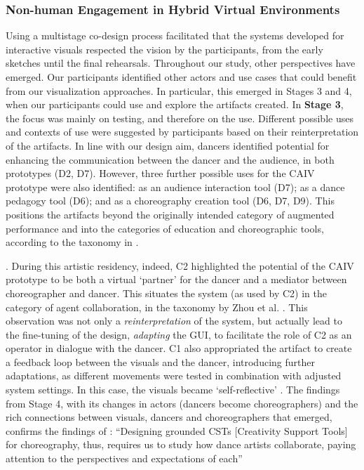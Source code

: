 \subsubsection{Non-human Engagement in Hybrid Virtual Environments}

Using a multistage co-design process facilitated that the systems developed for interactive visuals respected the vision by the participants, from the early sketches until the final rehearsals. Throughout our study, other perspectives have emerged. Our participants identified other actors and use cases that could benefit from our visualization approaches. In particular, this emerged in Stages 3 and 4, when our participants could use and explore the artifacts created. In \textbf{Stage 3}, the focus was mainly on testing, and therefore on the use. Different possible uses and contexts of use were suggested by participants based on their reinterpretation of the artifacts. In line with our design aim, dancers identified potential for enhancing the communication between the dancer and the audience, in both prototypes (D2, D7). However, three further possible uses for the CAIV prototype were also identified: as an audience interaction tool (D7); as a dance pedagogy tool (D6); and as a choreography creation tool (D6, D7, D9). This positions the artifacts beyond the originally intended category of augmented performance and into the categories of education and choreographic tools, according to the taxonomy in \cite{raheb_dance_2019}.

\cite{dix_designing_2007}. During this artistic residency, indeed, C2 highlighted the potential of the CAIV prototype to be both a virtual ‘partner’ for the dancer \cite{hsueh_understanding_2019} and a mediator between choreographer and dancer. This situates the system (as used by C2) in the category of agent collaboration, in the taxonomy by Zhou et al. \cite{zhou_dance_2021}. This observation was not only a \textit{reinterpretation} of the system, but actually lead to the fine-tuning of the design, \textit{adapting} the GUI, to facilitate the role of C2 as an operator in dialogue with the dancer. C1 also appropriated the artifact to create a feedback loop between the visuals and the dancer, introducing further adaptations, as different movements were tested in combination with adjusted system settings. In this case, the visuals became ‘self-reflective' \cite{hsueh_understanding_2019}. The findings from Stage 4, with its changes in actors (dancers become choreographers) and the rich connections between visuals, dancers and choreographers that emerged, confirms the findings of \citeauthor{felice_studying_2021}: “Designing grounded CSTs [Creativity Support Tools] for choreography, thus, requires us to study how dance artists collaborate, paying attention to the perspectives and expectations of each” \cite{felice_studying_2021}

